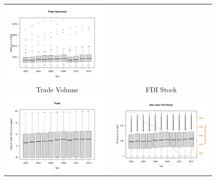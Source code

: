 \documentclass[reqno,onecolumn,letterpaper,12pt]{article}
\begin{document}
\begin{figure}[htp]
\begin{tabular}{c@{\hskip -.4cm}c}
\includegraphics[height=.2\textheight, clip=true, trim=.95cm 1cm 0cm 1.6cm]{draft_figures/descriptive_plots/TradeO.pdf}   \\
Trade Volume &
FDI Stock\\
\includegraphics[height=.2\textheight, clip=true, trim=1cm 1cm 0cm 1.6cm]{draft_figures/descriptive_plots/TradeV.pdf}    &
\includegraphics[height=.2\textheight, clip=true, trim=1cm 1cm 0cm 1.6cm]{draft_figures/descriptive_plots/fdi_stock.pdf}   \\

\end{tabular}
\end{figure}
\end{document}
